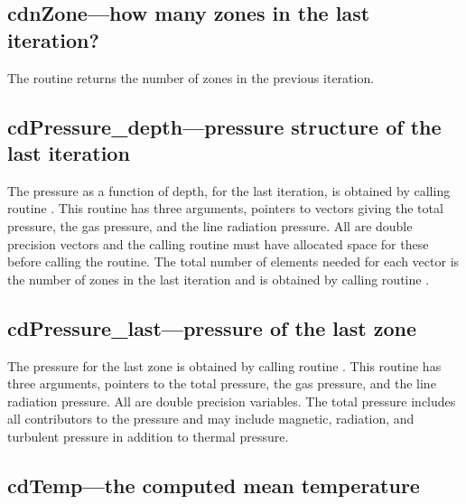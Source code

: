 \subsection{cdnZone---how many zones in the last iteration?}

The routine returns the number of zones in the previous iteration.

\subsection{cdPressure\_depth---pressure structure of the last iteration }

The pressure as a function of depth, for the last iteration, is obtained
by calling routine .  This routine has three arguments,
pointers to vectors giving the total pressure, the gas pressure, and the
line radiation pressure.  All are double precision vectors and the calling
routine must have allocated space for these before calling the routine.
The total number of elements needed for each vector is the number of zones
in the last iteration and is obtained by calling routine .

\subsection{cdPressure\_last---pressure of the last zone }

The pressure for the last zone is obtained by calling routine
.
This routine has three arguments, pointers to the total
pressure, the gas pressure, and the line radiation pressure.
All are double
precision variables.
The total pressure includes all contributors to the
pressure and may include magnetic, radiation, and turbulent pressure in
addition to thermal pressure.

\subsection{cdTemp---the computed mean temperature}
\label{sec:SubroutineCdTemp}

